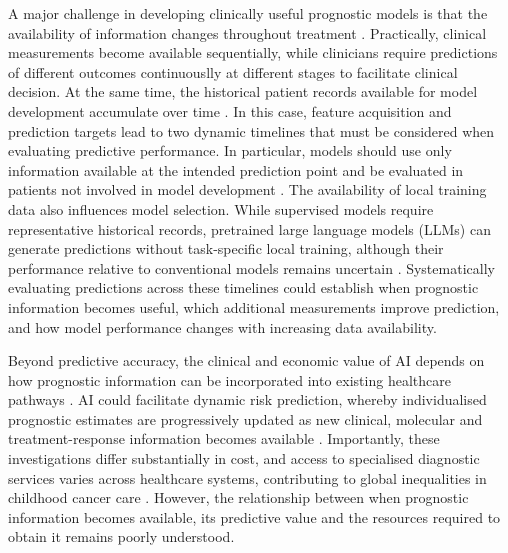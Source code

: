 \documentclass[pdflatex,sn-nature]{sn-jnl}
\begin{document}
A major challenge in developing clinically useful prognostic models is that the availability of information changes throughout treatment \cite{sullivan2026ethics}. Practically, clinical measurements become available sequentially, while clinicians require predictions of different outcomes continuouslly at different stages to facilitate clinical decision. At the same time, the historical patient records available for model development accumulate over time \cite{jenkins2021continual}. In this case, feature acquisition and prediction targets lead to two dynamic timelines that must be considered when evaluating predictive performance. In particular, models should use only information available at the intended prediction point and be evaluated in patients not involved in model development \cite{Riley2024}. The availability of local training data also influences model selection. While supervised models require representative historical records, pretrained large language models (LLMs) can generate predictions without task-specific local training, although their performance relative to conventional models remains uncertain \cite{Jiang2023,Renc2024,Brown2025JAMIA}. Systematically evaluating predictions across these timelines could establish when prognostic information becomes useful, which additional measurements improve prediction, and how model performance changes with increasing data availability. 

Beyond predictive accuracy, the clinical and economic value of AI depends on how prognostic information can be incorporated into existing healthcare pathways \cite{jiao2023economic}. AI could facilitate dynamic risk prediction, whereby individualised prognostic estimates are progressively updated as new clinical, molecular and treatment-response information becomes available \cite{van2007dynamic}. Importantly, these investigations differ substantially in cost, and access to specialised diagnostic services varies across healthcare systems, contributing to global inequalities in childhood cancer care \cite{Atun2020,WHO2021}. However, the relationship between when prognostic information becomes available, its predictive value and the resources required to obtain it remains poorly understood.
\end{document}

